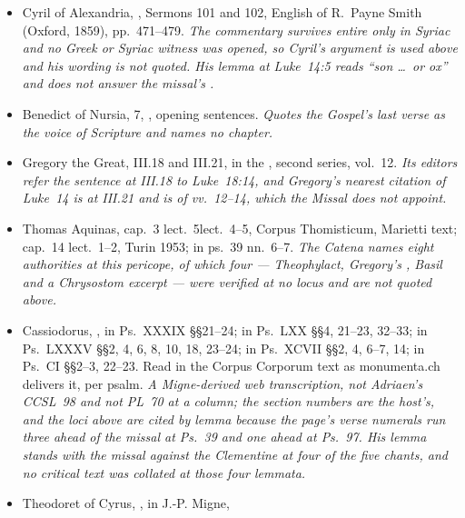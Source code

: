 \begin{itemize}[leftmargin=1.2em, itemsep=0.15em]
{Fathers}, first series, vol.~13, as New Advent delivers it.
\textit{Read in English; the Greek of PG~62 was not opened, so no argument above
rests on his wording.}
\item Cyril of Alexandria, , Sermons 101 and 102, English of R.~Payne Smith (Oxford, 1859),
pp.~471--479. \textit{The commentary survives entire only in Syriac and no Greek
or Syriac witness was opened, so Cyril's argument is used above and his wording
is not quoted. His lemma at Luke~14:5 reads ``son \dots\ or ox'' and does not
answer the missal's .}
\item Benedict of Nursia,  7, , opening
sentences. \textit{Quotes the Gospel's last verse as the voice of Scripture and
names no chapter.}
\ifdefined\TriptychSynthesisEdition\else
\item Gregory the Great,  III.18 and III.21, in the
, second series, vol.~12. \textit{Its
editors refer the sentence at III.18 to Luke~18:14, and Gregory's nearest
citation of Luke~14 is at III.21 and is of vv.~12--14, which the Missal does not
appoint.}
\fi
\item Thomas Aquinas,  cap.~3
\ifdefined\TriptychSynthesisEdition lect.~5\else lect.~4--5\fi{}, Corpus
Thomisticum, Marietti text; 
cap.~14 lect.~1--2, Turin 1953;  in ps.~39
nn.~6--7. \textit{The Catena names eight authorities at this pericope, of which
four --- Theophylact, Gregory's , Basil and a Chrysostom excerpt
--- were verified at no locus and are not quoted above.}
\item Cassiodorus, , in Ps.~XXXIX \S\S21--24; in
Ps.~LXX \S\S4, 21--23, 32--33; in Ps.~LXXXV \S\S2, 4, 6, 8, 10, 18, 23--24; in
Ps.~XCVII \S\S2, 4, 6--7, 14; in Ps.~CI \S\S2--3, 22--23. Read in the Corpus
Corporum text as monumenta.ch delivers it, per psalm. \textit{A Migne-derived web
transcription, not Adriaen's CCSL~98 and not PL~70 at a column; the section
numbers are the host's, and the loci above are cited by lemma because the page's
verse numerals run three ahead of the missal at Ps.~39 and one ahead at Ps.~97.
His lemma stands with the missal against the Clementine at four of the five
chants, and no critical text was collated at those four lemmata.}
\item Theodoret of Cyrus, , in J.-P. Migne,

\end{itemize}
